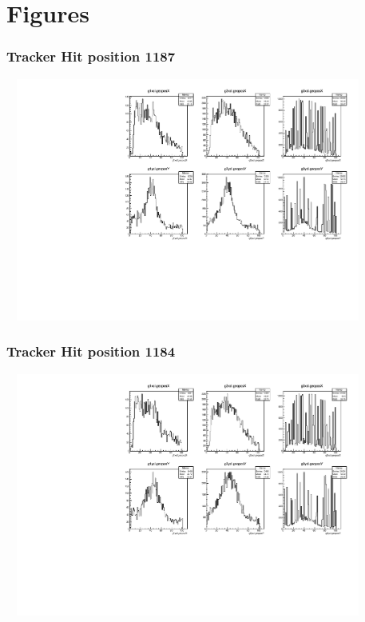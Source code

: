 \documentclass[slidestop,compress,mathserif]{beamer}
\begin{document}
\section{Figures}
\begin{frame}\frametitle{Tracker Hit position 1187}
	 \includegraphics[width=12cm,height=8cm]{Tracker_Hit_position_1187.pdf}
\end{frame}
\begin{frame}\frametitle{Tracker Hit position 1184}
	 \includegraphics[width=12cm,height=8cm]{Tracker_Hit_position_1184.pdf}
\end{frame}
\end{document}
